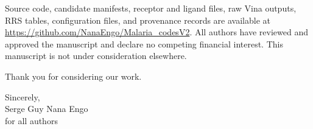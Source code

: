 \documentclass[11pt]{article}
\begin{document}
Source code, candidate manifests, receptor and ligand files, raw Vina outputs, RRS tables, configuration files, and provenance records are available at \url{https://github.com/NanaEngo/Malaria_codesV2}. All authors have reviewed and approved the manuscript and declare no competing financial interest. This manuscript is not under consideration elsewhere.

Thank you for considering our work.

\vspace{1em}
Sincerely,\\
Serge Guy Nana Engo\\
for all authors
\end{document}
